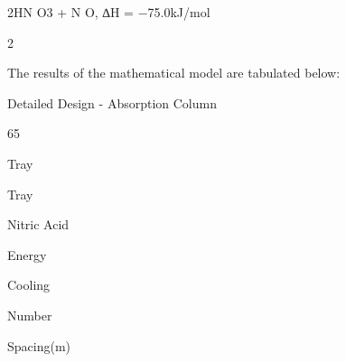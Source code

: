\documentclass[a4paper,portrait,12pt]{article}
\begin{document}
\begin{flushleft}
2HN O3 + N O, ∆H = $-$75.0kJ/mol
\end{flushleft}


2


\begin{flushleft}
The results of the mathematical model are tabulated below:
\end{flushleft}





\begin{flushleft}
\newpage
Detailed Design - Absorption Column
\end{flushleft}





65





\begin{flushleft}
Tray
\end{flushleft}





\begin{flushleft}
Tray
\end{flushleft}





\begin{flushleft}
Nitric Acid
\end{flushleft}





\begin{flushleft}
Energy
\end{flushleft}





\begin{flushleft}
Cooling
\end{flushleft}





\begin{flushleft}
Number
\end{flushleft}





\begin{flushleft}
Spacing(m)
\end{flushleft}
\end{document}
